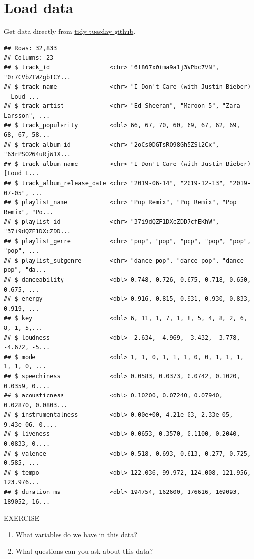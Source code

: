 \documentclass[
]{book}
\begin{document}
\hypertarget{load-data}{%
\section{Load data}\label{load-data}}

Get data directly from \href{https://raw.githubusercontent.com/rfordatascience/tidytuesday/master/data/2020/2020-01-21/spotify_songs.csv}{tidy tuesday github}.

\begin{verbatim}
## Rows: 32,833
## Columns: 23
## $ track_id                 <chr> "6f807x0ima9a1j3VPbc7VN", "0r7CVbZTWZgbTCY...
## $ track_name               <chr> "I Don't Care (with Justin Bieber) - Loud ...
## $ track_artist             <chr> "Ed Sheeran", "Maroon 5", "Zara Larsson", ...
## $ track_popularity         <dbl> 66, 67, 70, 60, 69, 67, 62, 69, 68, 67, 58...
## $ track_album_id           <chr> "2oCs0DGTsRO98Gh5ZSl2Cx", "63rPSO264uRjW1X...
## $ track_album_name         <chr> "I Don't Care (with Justin Bieber) [Loud L...
## $ track_album_release_date <chr> "2019-06-14", "2019-12-13", "2019-07-05", ...
## $ playlist_name            <chr> "Pop Remix", "Pop Remix", "Pop Remix", "Po...
## $ playlist_id              <chr> "37i9dQZF1DXcZDD7cfEKhW", "37i9dQZF1DXcZDD...
## $ playlist_genre           <chr> "pop", "pop", "pop", "pop", "pop", "pop", ...
## $ playlist_subgenre        <chr> "dance pop", "dance pop", "dance pop", "da...
## $ danceability             <dbl> 0.748, 0.726, 0.675, 0.718, 0.650, 0.675, ...
## $ energy                   <dbl> 0.916, 0.815, 0.931, 0.930, 0.833, 0.919, ...
## $ key                      <dbl> 6, 11, 1, 7, 1, 8, 5, 4, 8, 2, 6, 8, 1, 5,...
## $ loudness                 <dbl> -2.634, -4.969, -3.432, -3.778, -4.672, -5...
## $ mode                     <dbl> 1, 1, 0, 1, 1, 1, 0, 0, 1, 1, 1, 1, 1, 0, ...
## $ speechiness              <dbl> 0.0583, 0.0373, 0.0742, 0.1020, 0.0359, 0....
## $ acousticness             <dbl> 0.10200, 0.07240, 0.07940, 0.02870, 0.0803...
## $ instrumentalness         <dbl> 0.00e+00, 4.21e-03, 2.33e-05, 9.43e-06, 0....
## $ liveness                 <dbl> 0.0653, 0.3570, 0.1100, 0.2040, 0.0833, 0....
## $ valence                  <dbl> 0.518, 0.693, 0.613, 0.277, 0.725, 0.585, ...
## $ tempo                    <dbl> 122.036, 99.972, 124.008, 121.956, 123.976...
## $ duration_ms              <dbl> 194754, 162600, 176616, 169093, 189052, 16...
\end{verbatim}

EXERCISE

\begin{enumerate}
\def\labelenumi{\arabic{enumi})}
\item
  What variables do we have in this data?
\item
  What questions can you ask about this data?
\end{enumerate}
\end{document}
